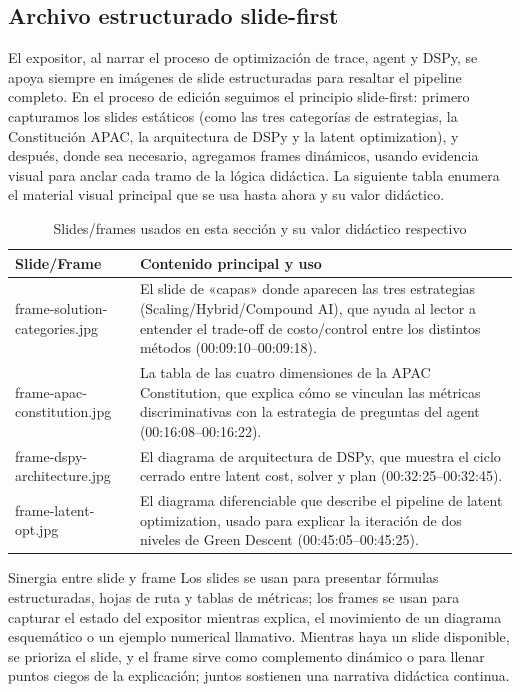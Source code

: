 \documentclass[a4paper]{article}
\begin{document}
\subsection{Archivo estructurado slide-first}
El expositor, al narrar el proceso de optimización de trace, agent y DSPy, se apoya siempre en imágenes de slide estructuradas para resaltar el pipeline completo. En el proceso de edición seguimos el principio slide-first: primero capturamos los slides estáticos (como las tres categorías de estrategias, la Constitución APAC, la arquitectura de DSPy y la latent optimization), y después, donde sea necesario, agregamos frames dinámicos, usando evidencia visual para anclar cada tramo de la lógica didáctica. La siguiente tabla enumera el material visual principal que se usa hasta ahora y su valor didáctico.
\begin{table}[H]
\centering
\begin{tabular}{lp{8cm}}
\toprule
Slide/Frame & Contenido principal y uso \\
\midrule
frame-solution-categories.jpg & El slide de «capas» donde aparecen las tres estrategias (Scaling/Hybrid/Compound AI), que ayuda al lector a entender el trade-off de costo/control entre los distintos métodos (00:09:10--00:09:18). \\
frame-apac-constitution.jpg & La tabla de las cuatro dimensiones de la APAC Constitution, que explica cómo se vinculan las métricas discriminativas con la estrategia de preguntas del agent (00:16:08--00:16:22). \\
frame-dspy-architecture.jpg & El diagrama de arquitectura de DSPy, que muestra el ciclo cerrado entre latent cost, solver y plan (00:32:25--00:32:45). \\
frame-latent-opt.jpg & El diagrama diferenciable que describe el pipeline de latent optimization, usado para explicar la iteración de dos niveles de Green Descent (00:45:05--00:45:25). \\
\bottomrule
\end{tabular}
\caption{Slides/frames usados en esta sección y su valor didáctico respectivo}
\end{table}
\begin{knowledgebox}{Sinergia entre slide y frame}
Los slides se usan para presentar fórmulas estructuradas, hojas de ruta y tablas de métricas; los frames se usan para capturar el estado del expositor mientras explica, el movimiento de un diagrama esquemático o un ejemplo numerical llamativo. Mientras haya un slide disponible, se prioriza el slide, y el frame sirve como complemento dinámico o para llenar puntos ciegos de la explicación; juntos sostienen una narrativa didáctica continua.
\end{knowledgebox}
\end{document}
